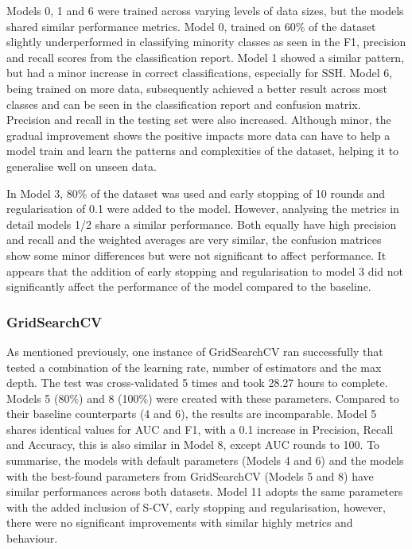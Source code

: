 \smallskip
Models 0, 1 and 6 were trained across varying levels of data sizes, but the models shared similar performance metrics. Model 0, trained on 60\% of the dataset slightly underperformed in classifying minority classes as seen in the F1, precision and recall scores from the classification report. Model 1 showed a similar pattern, but had a minor increase in correct classifications, especially for SSH. Model 6, being trained on more data, subsequently achieved a better result across most classes and can be seen in the classification report and confusion matrix. Precision and recall in the testing set were also increased. Although minor, the gradual improvement shows the positive impacts more data can have to help a model train and learn the patterns and complexities of the dataset, helping it to generalise well on unseen data.

\smallskip
In Model 3, 80\% of the dataset was used and early stopping of 10 rounds and regularisation of 0.1 were added to the model. However, analysing the metrics in detail models 1/2 share a similar performance. Both equally have high precision and recall and the weighted averages are very similar, the confusion matrices show some minor differences but were not significant to affect performance. It appears that the addition of early stopping and regularisation to model 3 did not significantly affect the performance of the model compared to the baseline. 

\medskip

\subsubsection*{GridSearchCV}

\smallskip
As mentioned previously, one instance of GridSearchCV ran successfully that tested a combination of the learning rate, number of estimators and the max depth. The test was cross-validated 5 times and took 28.27 hours to complete. Models 5 (80\%) and 8 (100\%) were created with these parameters. Compared to their baseline counterparts (4 and 6), the results are incomparable. Model 5 shares identical values for AUC and F1, with a 0.1 increase in Precision, Recall and Accuracy, this is also similar in Model 8, except AUC rounds to 100. To summarise, the models with default parameters (Models 4 and 6) and the models with the best-found parameters from GridSearchCV (Models 5 and 8) have similar performances across both datasets. Model 11 adopts the same parameters with the added inclusion of S-CV, early stopping and regularisation, however, there were no significant improvements with similar highly metrics and behaviour.

